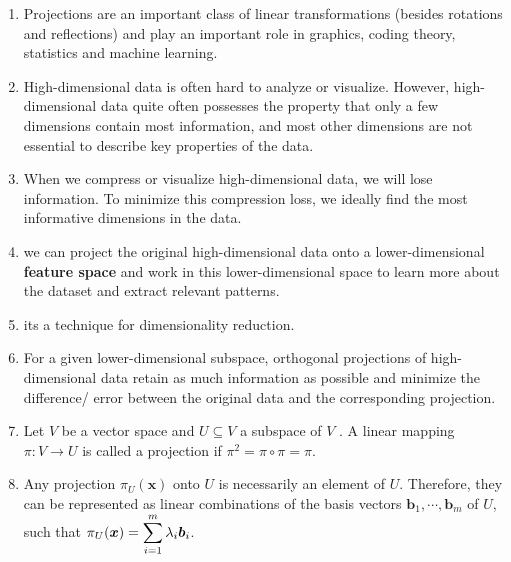 \begin{enumerate}
    \item Projections are an important class of linear transformations (besides rotations and reflections) and play an important role in graphics, coding theory, statistics and machine learning.
    \hfill \cite{mfml/book/mml/Deisenroth-Faisal-Ong}

    \item High-dimensional data is often hard to analyze or visualize. 
    However, high-dimensional data quite often possesses the property that only a few dimensions contain most information, and most other dimensions are not essential to describe key properties of the data. 
    \hfill \cite{mfml/book/mml/Deisenroth-Faisal-Ong}

    \item When we compress or visualize high-dimensional data, we will lose information. To minimize this compression loss, we ideally find the most informative dimensions in the data.
    \hfill \cite{mfml/book/mml/Deisenroth-Faisal-Ong}

    \item we can project the original high-dimensional data onto a lower-dimensional \textbf{feature space} and work in this lower-dimensional space to learn more about the dataset and extract relevant patterns.
    \hfill \cite{mfml/book/mml/Deisenroth-Faisal-Ong}

    \item its a technique for dimensionality reduction.
    \hfill \cite{mfml/book/mml/Deisenroth-Faisal-Ong}

    \item For a given lower-dimensional subspace, orthogonal projections of high-dimensional data retain as much information as possible and minimize the difference/ error between the original data and the corresponding projection.
    \hfill \cite{mfml/book/mml/Deisenroth-Faisal-Ong}

    \item 
    \begin{definition}[projection]
        Let $V$ be a vector space and $U \subseteq V$ a subspace of $V$ . 
        A linear mapping $\pi : V \to U$ is called a projection if $\pi^2 = \pi \circ \pi = \pi$.
        \hfill \cite{mfml/book/mml/Deisenroth-Faisal-Ong}
    \end{definition}

    \item Any projection $\pi_U (\bm{x})$ onto $U$ is necessarily an element of $U$.
    Therefore, they can be represented as linear combinations of the basis vectors $\bm{b}_1, \cdots , \bm{b}_m$ of $U$, such that $\pi_U (\bm{x}) = \displaystyle\sum ^m _{i=1} \lambda_i \bm{b}_i$.
    \hfill \cite{mfml/book/mml/Deisenroth-Faisal-Ong}


\end{enumerate}
